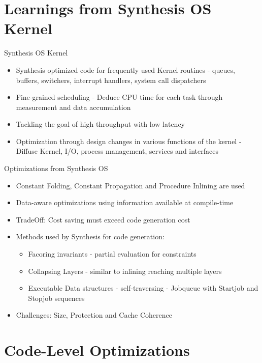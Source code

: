 \documentclass[10pt,aspectratio=\ratio,
compress
]{beamer}
\begin{document}
\section{Learnings from Synthesis OS Kernel}
\begin{frame}{Synthesis OS Kernel} 
    \begin{itemize}
        \item Synthesis optimized code for frequently used Kernel routines - queues, buffers, switchers, interrupt handlers, system call dispatchers
        \item Fine-grained scheduling - Deduce CPU time for each task through measurement and data accumulation
        \item Tackling the goal of high throughput with low latency
        \item Optimization through design changes in various functions of the kernel - Diffuse Kernel, I/O, process management, services and interfaces
    \end{itemize}
\end{frame}


\begin{frame}{Optimizations from Synthesis OS}
    \begin{itemize}
        \item Constant Folding, Constant Propagation and Procedure Inlining are used
        \item Data-aware optimizations using information available at compile-time
        \item TradeOff: Cost saving must exceed code generation cost
        \item Methods used by Synthesis for code generation:
            \begin{itemize}
                \item Facoring invariants - partial evaluation for constraints
                \item Collapsing Layers - similar to inlining reaching multiple layers
                \item Executable Data structures - self-traversing - Jobqueue with Startjob and Stopjob sequences
            \end{itemize}
        \item Challenges: Size, Protection and Cache Coherence
    \end{itemize}
\end{frame}


\section{Code-Level Optimizations}
\end{document}

